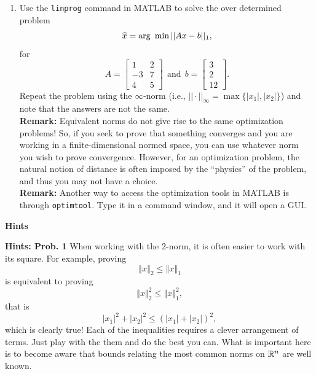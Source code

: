 \documentclass[letterpaper]{article}
\begin{document}
\begin{enumerate}
\begin{enumerate}
  $$A_{in}=\left[\begin{array}{rrrr}  1 & 2 & 3 &4 \\  5& 6 & 7 & 8\end{array} \right]~~\text{and} ~~ b_{in} = \left[\begin{array}{c}  9 \\ 10\end{array} \right].$$

\end{enumerate}
    \item Use the \texttt{linprog} command in MATLAB to solve the over determined problem
    $$ \widehat{x} = {\rm arg}~\min ||Ax-b||_1,$$
    for $$A=\left[\begin{array}{rr}  1 & 2 \\
    -3& 7 \\
    4 & 5\end{array} \right]~~\text{and} ~~ b = \left[\begin{array}{c}  3 \\ 2 \\ 12\end{array} \right].$$
    Repeat the problem using the $\infty$-norm (i.e., $||\cdot||_\infty = \max \{ |x_1|, |x_2|\}$) and note that the answers are not the same.\\

    \noindent \textbf{Remark:} Equivalent norms do not give rise to the same optimization problems! So, if you seek to prove that something converges and you are working in a finite-dimensional normed space, you can use whatever norm you wish to prove convergence. However, for an optimization problem, the natural notion of distance is often imposed by the ``physics'' of the problem, and thus you may not have a choice.\\

    \noindent \textbf{Remark:}   Another way to access the optimization tools in MATLAB is through \texttt{optimtool}. Type it in a command window, and it will open a GUI.


\end{enumerate}

\newpage

\begin{center}
{\bf Hints}
\end{center}
\noindent \textbf{Hints: Prob. 1 } When working with the 2-norm, it is often easier to work with its square. For example, proving $$\left\Vert x\right\Vert _{2}  \le\left\Vert x\right\Vert _{1}$$ is equivalent to proving
$$\left\Vert x\right\Vert _{2}^{2}  \le\left\Vert x\right\Vert _{1}^{2},$$
that is
$$ |x_1|^2 + |x_2|^2 \le (|x_1| + |x_2|)^2,$$
which is clearly true! Each of the inequalities requires a clever arrangement of terms. Just play with the them and do the best you can. What is important here is to become aware that bounds relating the most common norms on $\mathbb R^n$ are well known. \\
\end{document}
